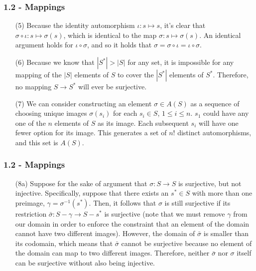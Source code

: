 \documentclass{beamer}
\begin{document}
\begin{frame}
\frametitle{1.2 - Mappings}
\small
\begin{enumerate}
	\item[(5)] Because the identity automorphism $\iota: s\mapsto s$, it's clear that $\sigma\circ\iota: s\mapsto \sigma(s)$, which is identical to the map $\sigma: s\mapsto \sigma(s)$. An identical argument holds for $\iota\circ\sigma$, and so it holds that $\sigma=\sigma\circ\iota=\iota\circ\sigma$.
	\item[(6)] Because we know that $|S^*|>|S|$ for any set, it is impossible for any mapping of the $|S|$ elements of $S$ to cover the $|S^*|$ elements of $S^*$. Therefore, no mapping $S\to S^*$ will ever be surjective.
	\item[(7)] We can consider constructing an element $\sigma\in A(S)$ as a sequence of choosing unique images $\sigma(s_i)$ for each $s_i \in S$, $1\leq i \leq n$. $s_1$ could have any one of the $n$ elements of $S$ as its image. Each subsequent $s_i$ will have one fewer option for its image. This generates a set of $n!$ distinct automorphisms, and this set is $A(S)$.
\end{enumerate}
\end{frame}
\begin{frame}
\frametitle{1.2 - Mappings}
\small
\begin{enumerate}
	\item[(8a)] Suppose for the sake of argument that $\sigma: S\to S$ is surjective, but not injective. Specifically, suppose that there exists an $s^*\in S$ with more than one preimage, $\gamma = \sigma^{-1}(s^*)$. Then, it follows that $\sigma$ is still surjective if its restriction $\bar{\sigma}: S-\gamma\to S-{s^*}$ is surjective (note that we must remove $\gamma$ from our domain in order to enforce the constraint that an element of the domain cannot have two different images). However, the domain of $\bar{\sigma}$ is smaller than its codomain, which means that $\bar{\sigma}$ cannot be surjective because no element of the domain can map to two different images. Therefore, neither $\bar{\sigma}$ nor $\sigma$ itself can be surjective without also being injective.
\end{enumerate}
\end{frame}
\end{document}
